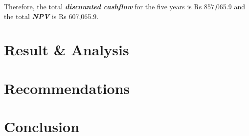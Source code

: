 \documentclass{article}
\begin{document}
Therefore, the total \textit{\textbf{discounted cashflow}} for the five years is Rs 857,065.9 and the total \textit{\textbf{NPV}} is Rs 607,065.9.\\

\section{Result \& Analysis}
\blindtext


\section{Recommendations}
\blindtext

\section{Conclusion}
\blindtext



\end{document}
